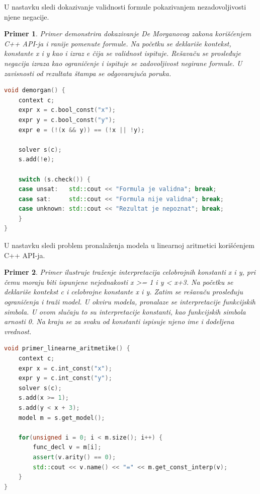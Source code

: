 \documentclass[12pt,oneside]{memoir}
\newtheorem{primer}{Primer}
\begin{document}
U nastavku sledi dokazivanje validnosti formule pokazivanjem nezadovoljivosti njene negacije.
\begin{primer} Primer demonstrira dokazivanje De Morganovog zakona korišćenjem C++ API-ja i ranije pomenute formule. Na početku se deklariše kontekst, konstante x i y kao i izraz e čija se validnost ispituje. Rešavaču se prosleđuje negacija izraza kao ograničenje i ispituje se zadovoljivost negirane formule. U zavisnosti od rezultata štampa se odgovarajuća poruka.
\begin{lstlisting}[language=C++]
void demorgan() {
    context c;
    expr x = c.bool_const("x");
    expr y = c.bool_const("y");
    expr e = (!(x && y)) == (!x || !y);
    
    solver s(c);
    s.add(!e);

    switch (s.check()) {
    case unsat:   std::cout << "Formula je validna"; break;
    case sat:     std::cout << "Formula nije validna"; break;
    case unknown: std::cout << "Rezultat je nepoznat"; break;
    }
}
\end{lstlisting}
\end{primer}

U nastavku sledi problem pronalaženja modela u linearnoj aritmetici korišćenjem C++ API-ja. 
\begin{primer} Primer ilustruje traženje interpretacija celobrojnih konstanti x i y, pri čemu moraju biti ispunjene nejednakosti x >= 1 i y < x+3. Na početku se deklariše kontekst c i celobrojne konstante x i y. Zatim se rešavaču prosleđuju ograničenja i traži model. U okviru modela, pronalaze se interpretacije funkcijskih simbola. U ovom slučaju to su interpretacije konstanti, kao funkcijskih simbola arnosti 0. Na kraju se za svaku od konstanti ispisuje njeno ime i dodeljena vrednost. \\
\begin{lstlisting}[language=C++]
void primer_linearne_aritmetike() {
    context c;
    expr x = c.int_const("x");
    expr y = c.int_const("y");
    solver s(c);
    s.add(x >= 1);
    s.add(y < x + 3);
    model m = s.get_model();

    for(unsigned i = 0; i < m.size(); i++) {
        func_decl v = m[i];
        assert(v.arity() == 0); 
        std::cout << v.name() << "=" << m.get_const_interp(v);
    }
}
\end{lstlisting}
\end{primer}
\end{document}

